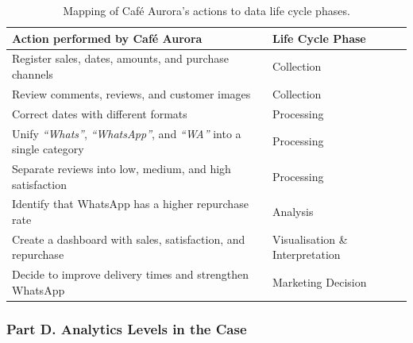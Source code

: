 \documentclass[12pt, a4paper]{article}
\newcommand{\Hcell}[1]{{\color{white}\textbf{#1}}}
\begin{document}
\begin{table}[H]
\centering
\caption{Mapping of Caf\'{e} Aurora's actions to data life cycle phases.}
\label{tab:partC}
\small
\begin{tabularx}{\textwidth}{X p{4.8cm}}
\toprule
\rowcolor{aqHdr}
\Hcell{Action performed by Caf\'{e} Aurora} &
\Hcell{Life Cycle Phase} \\
\midrule
Register sales, dates, amounts, and purchase channels &
  Collection \\
\rowcolor{aqRow}
Review comments, reviews, and customer images &
  Collection \\
Correct dates with different formats &
  Processing \\
\rowcolor{aqRow}
Unify \textit{``Whats''}, \textit{``WhatsApp''}, and \textit{``WA''} into a
single category &
  Processing \\
Separate reviews into low, medium, and high satisfaction &
  Processing \\
\rowcolor{aqRow}
Identify that WhatsApp has a higher repurchase rate &
  Analysis \\
Create a dashboard with sales, satisfaction, and repurchase &
  Visualisation \& Interpretation \\
\rowcolor{aqRow}
Decide to improve delivery times and strengthen WhatsApp &
  Marketing Decision \\
\bottomrule
\end{tabularx}
\end{table}

\subsubsection{Part D. Analytics Levels in the Case}
\end{document}
